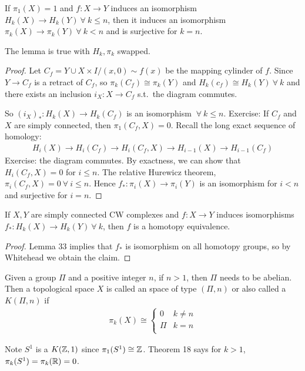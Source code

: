 \documentclass[12pt,class=article,crop=false]{standalone}
\begin{document}
\begin{lem}
If $ \pi_1(X)=1$ and $ f: X \to Y$ induces an isomorphism $ H_k(X) \to H_k(Y) \ \forall \ k \leq n$, then it induces an isomorphism $ \pi_k(X) \to \pi_k(Y) \ \forall \ k<n$ and is surjective for $ k=n$.
\end{lem}
\begin{remark}
The lemma is true with $ H_k,\pi_k$ swapped.
\end{remark}
\begin{proof}
Let $ C_f = Y \cup X\times I / (x,0) \sim f(x)$ be the mapping cylinder of  $ f$. Since $ Y \to C_f$ is a retract of $ C_f$, so  $ \pi_k(C_f) \cong \pi_k(Y)$ and $ H_k(c_f) \cong H_k(Y) \ \forall \ k$ and there exists an inclusion $ i_X: X \to C_f$ s.t.\ the diagram commutes.

So $ (i_X)_*: H_k(X) \to H_k(C_f)$ is an isomorphism $ \ \forall \ k \leq n$. Exercise: If $ C_f$ and  $ X$ are simply connected, then $ \pi_1(C_f,X)=0$. Recall the long exact sequence of homology:
\begin{align*}
	H_i(X) \to H_i(C_f) \to H_i(C_f, X) \to H_{i-1}(X) \to H_{i-1}(C_f)
\end{align*}
Exercise: the diagram commutes. By exactness, we can show that $ H_i(C_f,X) = 0$ for $ i \leq n$. The relative Hurewicz theorem,  $ \pi_i(C_f,X)=0 \ \forall \ i\leq n$. Hence $ f_*: \pi_i(X) \to \pi_i(Y)$ is an isomorphism for $ i<n$ and surjective for $ i=n$.
\end{proof}

\begin{thm}
If $ X,Y$ are simply connected CW complexes and  $ f: X \to Y$ induces isomorphisms $ f_*:H_k(X) \to H_k(Y) \ \forall \ k$, then $ f$ is a homotopy equivalence.
\end{thm}
\begin{proof}
Lemma 33 implies that $ f_*$ is isomorphism on all homotopy groups, so by Whitehead we obtain the claim.
\end{proof}

\begin{defn}
Given a group $ \Pi$ and a positive integer $ n$, if  $ n>1$, then  $ \Pi$ needs to be abelian. Then a topological space $ X$ is called an   space of type $ (\Pi,n)$ or also called a $ K(\Pi,n)$  if
 \begin{align*}
	\pi_k(X) \cong \begin{cases}
		0 & k \neq n\\
		\Pi & k=n\\
	\end{cases}
\end{align*}
\end{defn}
\begin{eg}
Note $ S^{1}$ is a $K(\mathbb{Z},1)$ since $ \pi_1(S^{1}) \cong \mathbb{Z}$. Theorem 18 says for $ k>1$, $ \pi_k(S^{1}) = \pi_k(\mathbb{R}) = 0$.
\end{eg}
\end{document}

